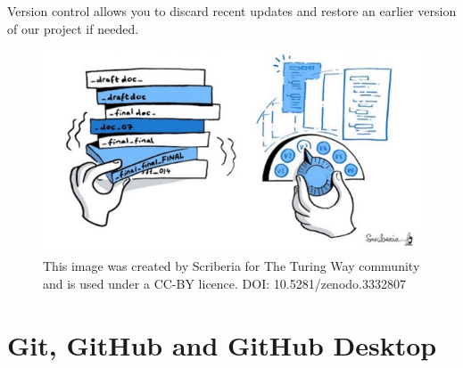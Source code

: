 \documentclass[
  letterpaper,
  DIV=11,
  numbers=noendperiod,
  oneside]{scrreprt}
\begin{document}
Version control allows you to discard recent updates and restore an
earlier version of our project if needed.

\begin{figure}

{\centering \includegraphics{./images/paste-EB447856.png}

}

\caption{This image was created by Scriberia for The Turing Way
community and is used under a CC-BY licence. DOI:
10.5281/zenodo.3332807}

\end{figure}

\hypertarget{git-github-and-github-desktop}{%
\section{Git, GitHub and GitHub
Desktop}\label{git-github-and-github-desktop}}
\end{document}

